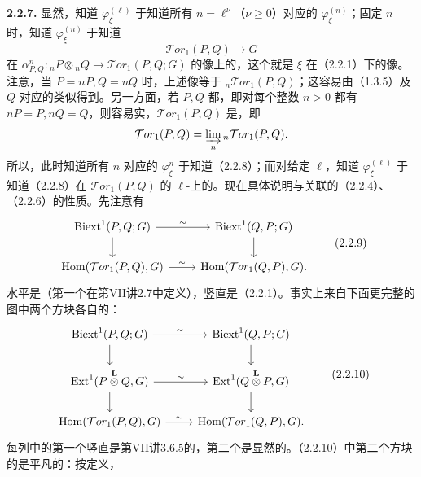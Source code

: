 \textbf{2.2.7.} 显然，知道 $\varphi_\xi^{(\ell)}$ 于知道所有 $n=\ell^\nu$（$\nu\geq0$）对应的 $\varphi_\xi^{(n)}$；固定 $n$ 时，知道 $\varphi_\xi^{(n)}$ 于知道
\[\mathcal Tor_1(P,Q)\longrightarrow G\tag{2.2.8}\]
在 $\alpha^n_{P,Q}:{}_nP\otimes{}_nQ\longrightarrow\mathcal Tor_1(P,Q;G)$ 的像上的，这个就是 $\xi$ 在（2.2.1）下的像。注意，当 $P=nP,Q=nQ$ 时，上述像等于 ${}_n\mathcal Tor_1(P,Q)$；这容易由（1.3.5）及 $Q$ 对应的类似得到。另一方面，若 $P,Q$ 都，即对每个整数 $n>0$ 都有 $nP=P,nQ=Q$，则容易实，$\mathcal Tor_1(P,Q)$ 是，即
\[\mathcal Tor_1(P,Q)=\varinjlim_n{}_n\mathcal Tor_1(P,Q).\]
所以，此时知道所有 $n$ 对应的 $\varphi_\xi^n$ 于知道（2.2.8）；而对给定 $\ell$，知道 $\varphi_\xi^{(\ell)}$ 于知道（2.2.8）在 $\mathcal Tor_1(P,Q)$ 的 $\ell$-上的。现在具体说明与关联的（2.2.4）、（2.2.6）的性质。先注意有
\[\begin{tikzcd}
\operatorname{Biext}^1(P,Q;G)\arrow[r,"\sim"]\arrow[d]&\operatorname{Biext}^1(Q,P;G)\arrow[d]\\
\operatorname{Hom}(\mathcal Tor_1(P,Q),G)\arrow[r,"\sim"]&\operatorname{Hom}(\mathcal Tor_1(Q,P),G).
\end{tikzcd}\tag{2.2.9}\]
水平是（第一个在第VII讲2.7中定义），竖直是（2.2.1）。事实上来自下面更完整的图中两个方块各自的：
\[\begin{tikzcd}
\operatorname{Biext}^1(P,Q;G)\arrow[r,"\sim"]\arrow[d]&\operatorname{Biext}^1(Q,P;G)\arrow[d]\\
\operatorname{Ext}^1(P\mathbin{\overset{\mathbf L}{\otimes}}Q,G)\arrow[r,"\sim"]\arrow[d]&
\operatorname{Ext}^1(Q\mathbin{\overset{\mathbf L}{\otimes}}P,G)\arrow[d]\\
\operatorname{Hom}(\mathcal Tor_1(P,Q),G)\arrow[r,"\sim"]&\operatorname{Hom}(\mathcal Tor_1(Q,P),G).
\end{tikzcd}\tag{2.2.10}\]
每列中的第一个竖直是第VII讲3.6.5的，第二个是显然的。（2.2.10）中第二个方块的是平凡的：按定义，
